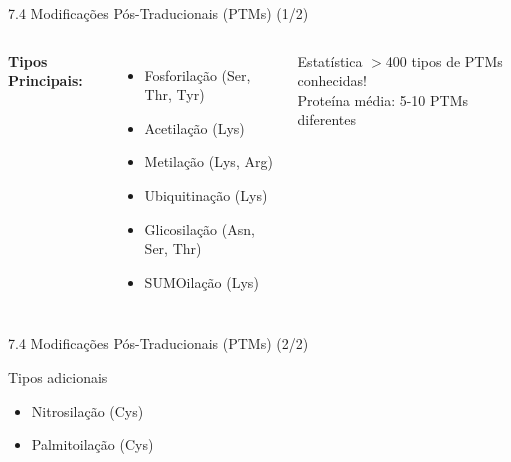 \begin{frame}[shrink=10]{7.4 Modificações Pós-Traducionais (PTMs) (1/2)}

\vspace{0.3cm}

\begin{columns}
\textbf{Tipos Principais:}
\begin{itemize}
    \item Fosforilação (Ser, Thr, Tyr)
    \item Acetilação (Lys)
    \item Metilação (Lys, Arg)
    \item Ubiquitinação (Lys)
    \item Glicosilação (Asn, Ser, Thr)
    \item SUMOilação (Lys)
\end{itemize}

\begin{alertblock}{Estatística}
$>$400 tipos de PTMs conhecidas!\\
Proteína média: 5-10 PTMs diferentes
\end{alertblock}
\end{columns}
\end{frame}

\begin{frame}[shrink=10]{7.4 Modificações Pós-Traducionais (PTMs) (2/2)}

\vspace{0.3cm}

\begin{block}{Tipos adicionais}
\begin{itemize}
    \item Nitrosilação (Cys)
    \item Palmitoilação (Cys)
\end{itemize}
\end{block}
\end{frame}

